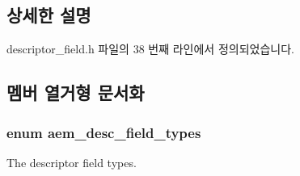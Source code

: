 \subsection{상세한 설명}


descriptor\+\_\+field.\+h 파일의 38 번째 라인에서 정의되었습니다.



\subsection{멤버 열거형 문서화}
\subsubsection[{\texorpdfstring{aem\+\_\+desc\+\_\+field\+\_\+types}{aem_desc_field_types}}]{\setlength{\rightskip}{0pt plus 5cm}enum {\bf aem\+\_\+desc\+\_\+field\+\_\+types}}\hypertarget{classavdecc__lib_1_1descriptor__field_afcc9e2e668064d50ec69a4f95b154396}{}\label{classavdecc__lib_1_1descriptor__field_afcc9e2e668064d50ec69a4f95b154396}


The descriptor field types. 

